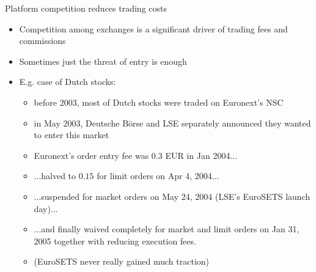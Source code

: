 \documentclass[english,10pt
,aspectratio=169
]{beamer}
\begin{document}

\begin{frame}{Platform competition reduces trading costs}
	\begin{itemize}
		\item Competition among exchanges is a significant driver of trading fees and commissions
		\item Sometimes just the threat of entry is enough
		\item E.g. case of Dutch stocks:
		\begin{exampleblock}{}
			\begin{itemize}
				\item before 2003, most of Dutch stocks were traded on Euronext's NSC
				\item in May 2003, Deutsche B{\"o}rse and LSE separately announced they wanted to enter this market
				\item Euronext's \alert{order entry fee} was $0.3$ EUR in Jan 2004...
				\item ...halved to $0.15$ for limit orders on Apr 4, 2004...
				\item ...suspended for market orders on May 24, 2004 (LSE's EuroSETS launch day)...
				\item ...and finally waived completely for market and limit orders on Jan 31, 2005 together with reducing execution fees.
				\item (EuroSETS never really gained much traction)
			\end{itemize}
		\end{exampleblock}
	\end{itemize}
\end{frame}
\end{document}

